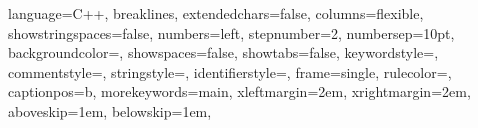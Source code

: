 \lstset
{
    language=C++,                       %
    breaklines,                         %
    extendedchars=false,                %
    columns=flexible,                   %
    showstringspaces=false,             %
    numbers=left,                       %
    stepnumber=2,                       %
    numbersep=10pt,                     %
    backgroundcolor=\color{white},      %
    showspaces=false,                   %
    showtabs=false,                     %
    keywordstyle=\color{blue},          %
    commentstyle=\color{dkgreen},       %
    stringstyle=\color{mauve},          %
    identifierstyle=\color{orange},     %
    frame=single,                       %
    rulecolor=\color{black},            %
    captionpos=b,                       %
    morekeywords={main},                %
    xleftmargin=2em,                    %
    xrightmargin=2em,                   %
    aboveskip=1em,                      %
    belowskip=1em,                      %
} 


